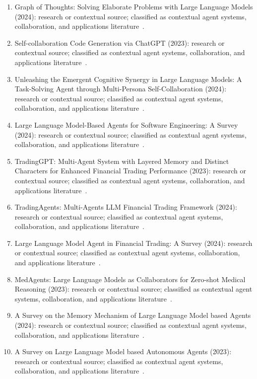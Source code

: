 \begin{enumerate}
\item Graph of Thoughts: Solving Elaborate Problems with Large Language Models (2024): research or contextual source; classified as contextual agent systems, collaboration, and applications literature~\cite{ext093}.
\item Self-collaboration Code Generation via {ChatGPT} (2023): research or contextual source; classified as contextual agent systems, collaboration, and applications literature~\cite{ext094}.
\item Unleashing the Emergent Cognitive Synergy in Large Language Models: A Task-Solving Agent through Multi-Persona Self-Collaboration (2024): research or contextual source; classified as contextual agent systems, collaboration, and applications literature~\cite{ext095}.
\item Large Language Model-Based Agents for Software Engineering: A Survey (2024): research or contextual source; classified as contextual agent systems, collaboration, and applications literature~\cite{ext096}.
\item {TradingGPT}: Multi-Agent System with Layered Memory and Distinct Characters for Enhanced Financial Trading Performance (2023): research or contextual source; classified as contextual agent systems, collaboration, and applications literature~\cite{ext097}.
\item {TradingAgents}: Multi-Agents {LLM} Financial Trading Framework (2024): research or contextual source; classified as contextual agent systems, collaboration, and applications literature~\cite{ext098}.
\item Large Language Model Agent in Financial Trading: A Survey (2024): research or contextual source; classified as contextual agent systems, collaboration, and applications literature~\cite{ext099}.
\item {MedAgents}: Large Language Models as Collaborators for Zero-shot Medical Reasoning (2023): research or contextual source; classified as contextual agent systems, collaboration, and applications literature~\cite{ext100}.
\item A Survey on the Memory Mechanism of Large Language Model based Agents (2024): research or contextual source; classified as contextual agent systems, collaboration, and applications literature~\cite{ext102}.
\item A Survey on Large Language Model based Autonomous Agents (2023): research or contextual source; classified as contextual agent systems, collaboration, and applications literature~\cite{ext103}.

\end{enumerate}
